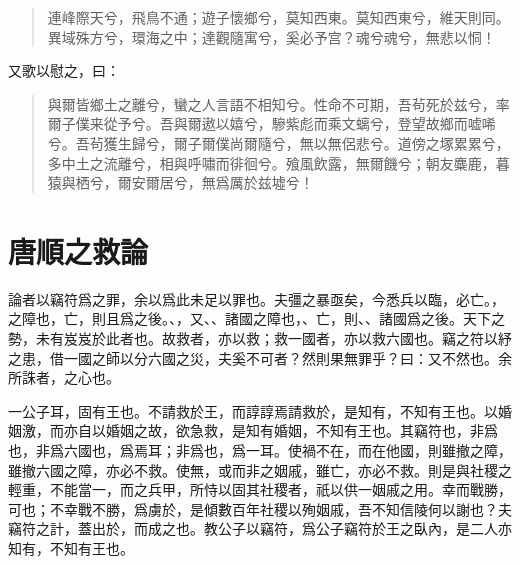 \begin{quote}
連峰際天兮，飛鳥不通；遊子懷鄉兮，莫知西東。莫知西東兮，維天則同。異域殊方兮，環海之中；達觀隨寓兮，{奚}必予宫？魂兮魂兮，無悲以恫！
\end{quote}%

又歌以慰之，曰：

\begin{quote}
與爾皆鄉土之離兮，蠻之人言語不相知兮。性命不可期，吾茍死於兹兮，率爾子僕来從予兮。吾與爾遨以嬉兮，驂紫彪而乘文螭兮，登望故鄉而嘘唏兮。吾茍獲生歸兮，爾子爾僕尚爾隨兮，{無以無侶悲兮}。道傍之塚累累兮，多中土之流離兮，相與呼嘯而徘徊兮。飱風飲露，無爾饑兮；朝友麋鹿，暮猿與栖兮，爾安爾居兮，無爲厲於兹墟兮！
\end{quote} %

\theendnotes

\section[信陵君救趙論\quad{\small 唐順之}]{{\normalsize 唐順之}\quad {}救論}
論者以竊符爲之罪，余以爲此未足以罪也。夫彊之暴亟矣，今悉兵以臨，必亡。，之障也，亡，則且爲之後。、，又、、諸國之障也，、亡，則、、諸國爲之後。天下之勢，未有岌岌於此者也。故救者，亦以救；救一國者，亦以救六國也。竊之符以紓之患，借一國之師以分六國之災，夫奚不可者？然則果無罪乎？曰：又不然也。余所誅者，之心也。

一公子耳，固有王也。不請救於王，而諄諄焉請救於，是知有，不知有王也。以婚姻激，而亦自以婚姻之故，欲急救，是知有婚姻，不知有王也。其竊符也，非爲也，非爲六國也，爲焉耳；非爲也，爲一耳。使禍不在，而在他國，則雖撤之障，雖撤六國之障，亦必不救。使無，或而非之姻戚，雖亡，亦必不救。則是與社稷之輕重，不能當一，而之兵甲，所恃以固其社稷者，祇以供一姻戚之用。幸而戰勝，可也；不幸戰不勝，爲虜於，是傾數百年社稷以殉姻戚，吾不知信陵何以謝也？夫竊符之計，蓋出於，而成之也。教公子以竊符，爲公子竊符於王之臥內，是二人亦知有，不知有王也。

